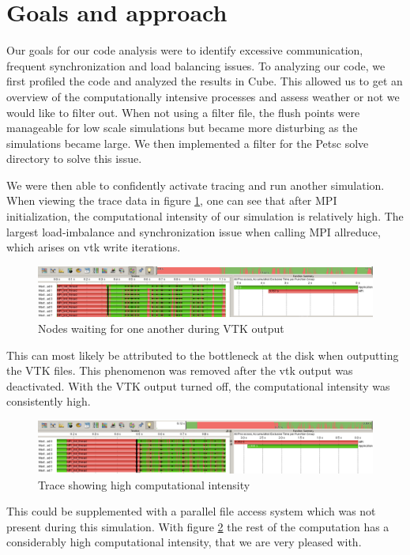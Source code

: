 \section{Goals and approach}

Our goals for our code analysis were to identify excessive communication,
frequent synchronization and load balancing issues. To analyzing our code, we
first profiled the code and analyzed the results in Cube. This allowed us to get
an overview of the computationally intensive processes and assess weather or not
we would like to filter out. When not using a filter file, the flush points were
manageable for low scale simulations but became more disturbing as the
simulations became large. We then implemented a filter for the Petsc solve
directory to solve this issue.

We were then able to confidently activate tracing and run another
simulation. When viewing the trace data in figure \ref{fig:scorep-trace-data},
one can see that after MPI initialization, the computational intensity of our
simulation is relatively high. The largest load-imbalance and synchronization
issue when calling MPI allreduce, which arises on vtk write iterations.

\begin{figure}[h]
  \centering
  \includegraphics[width=\textwidth]{FIGURES/scorep/trace-data}
  \caption{Nodes waiting for one another during VTK output}
  \label{fig:scorep-trace-data}
\end{figure}

This can most likely be attributed to the bottleneck at the disk when outputting
the VTK files. This phenomenon was removed after the vtk output was
deactivated. With the VTK output turned off, the computational intensity was
consistently high.

\begin{figure}[h]
  \centering
  \includegraphics[width=\textwidth]{FIGURES/scorep/reference}
  \caption{Trace showing high computational intensity}
  \label{fig:scorep-reference}
\end{figure}

This could be supplemented with a parallel file access system which was not
present during this simulation. With figure \ref{fig:scorep-reference} the rest
of the computation has a considerably high computational intensity, that we are
very pleased with.

